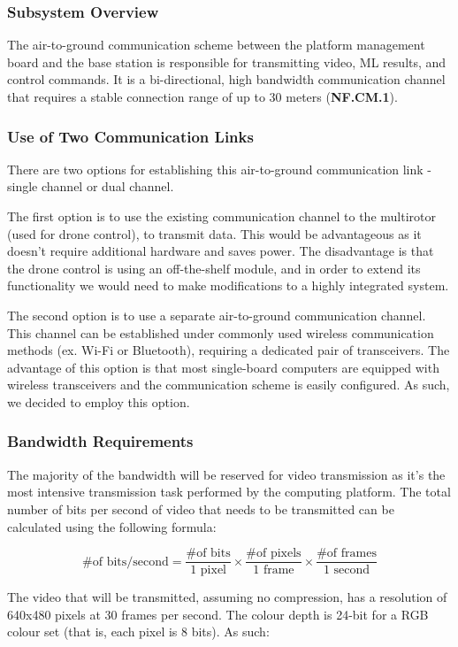 \subsubsection{Subsystem Overview}
The air-to-ground communication scheme between the platform management board and the base station is responsible for transmitting video, ML results, and control commands. It is a bi-directional, high bandwidth communication channel that requires a stable connection range of up to 30 meters (\textbf{NF.CM.1}).

\subsubsection{Use of Two Communication Links}
There are two options for establishing this air-to-ground communication link - single channel or dual channel. 

The first option is to use the existing communication channel to the multirotor (used for drone control), to transmit data. This would be advantageous as it doesn't require additional hardware and saves power. The disadvantage is that the drone control is using an off-the-shelf module, and in order to extend its functionality we would need to make modifications to a highly integrated system. 

The second option is to use a separate air-to-ground communication channel. This channel can be established under commonly used wireless communication methods (ex. Wi-Fi or Bluetooth), requiring a dedicated pair of transceivers. The advantage of this option is that most single-board computers are equipped with wireless transceivers and the communication scheme is easily configured. As such, we decided to employ this option.

\subsubsection{Bandwidth Requirements}

The majority of the bandwidth will be reserved for video transmission as it's the most intensive transmission task performed by the computing platform. The total number of bits per second of video that needs to be transmitted can be calculated using the following formula:

$$
\text{\# of bits/second} = \frac{\text{\# of bits}}{\text{1 pixel}} \times \frac{\text{\# of pixels}}{\text{1 frame}} \times \frac{\text{\# of frames}}{\text{1 second}}
$$

The video that will be transmitted, assuming no compression, has a resolution of 640x480 pixels at 30 frames per second. The colour depth is 24-bit for a RGB colour set (that is, each pixel is 8 bits). As such:

